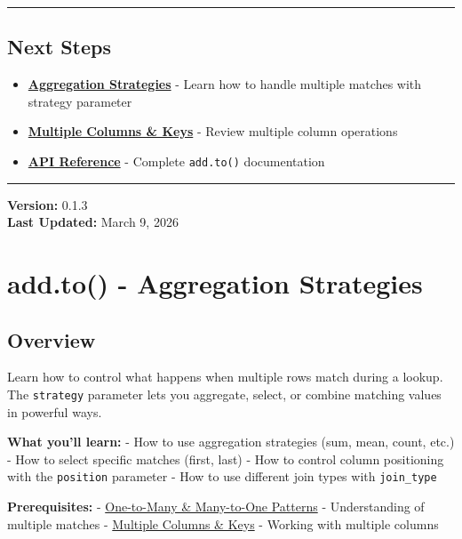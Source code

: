 \documentclass[
  letterpaper,
]{scrbook}
\providecommand{\tightlist}{%
  \setlength{\itemsep}{0pt}\setlength{\parskip}{0pt}}
\begin{document}
\begin{center}\rule{0.5\linewidth}{0.5pt}\end{center}

\section{Next Steps}\label{next-steps-4}

\begin{itemize}
\tightlist
\item
  \textbf{\href{examples-to-04-strategy.html}{Aggregation Strategies}} -
  Learn how to handle multiple matches with strategy parameter
\item
  \textbf{\href{examples-to-02-multiple.html}{Multiple Columns \& Keys}}
  - Review multiple column operations
\item
  \textbf{\href{reference-to-basic.html}{API Reference}} - Complete
  \texttt{add.to()} documentation
\end{itemize}

\begin{center}\rule{0.5\linewidth}{0.5pt}\end{center}

\textbf{Version:} 0.1.3\\
\textbf{Last Updated:} March 9, 2026

\chapter{add.to() - Aggregation
Strategies}\label{add.to---aggregation-strategies}

\section{Overview}\label{overview-3}

Learn how to control what happens when multiple rows match during a
lookup. The \texttt{strategy} parameter lets you aggregate, select, or
combine matching values in powerful ways.

\textbf{What you'll learn:} - How to use aggregation strategies (sum,
mean, count, etc.) - How to select specific matches (first, last) - How
to control column positioning with the \texttt{position} parameter - How
to use different join types with \texttt{join\_type}

\textbf{Prerequisites:} -
\href{examples-to-03-patterns.html}{One-to-Many \& Many-to-One Patterns}
- Understanding of multiple matches -
\href{examples-to-02-multiple.html}{Multiple Columns \& Keys} - Working
with multiple columns
\end{document}
